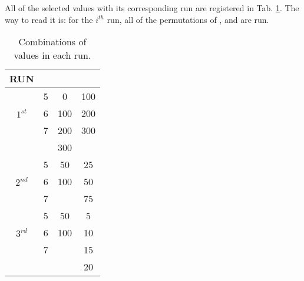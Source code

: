 All of the selected values with its corresponding run are registered in Tab. \ref{tab:runs}. The way to read it is: for the $i^{th}$ run, all of the permutations of \tauh, \vrot and \vout are run.\\

\begin{table}[htbp]
	\centering
	\caption{Combinations of values in each run.}
	\begin{tabular}{cccc}
		\hline
		RUN & \tauh & \vrot & \vout \\
		\hline
		& 5     & 0     & 100 \\
		$1^{st}$ & 6     & 100   & 200 \\
		& 7     & 200   & 300 \\
		&       & 300   &  \\
		\hline
		& 5     & 50    & 25 \\
		$2^{nd}$ & 6     & 100   & 50 \\
		& 7     &       & 75 \\
		\hline
		& 5     & 50    & 5 \\
		$3^{rd}$ & 6     & 100   & 10 \\
		& 7     &       & 15 \\
		&       &       & 20 \\
		\hline
	\end{tabular}%
	\label{tab:runs}%
\end{table}%
